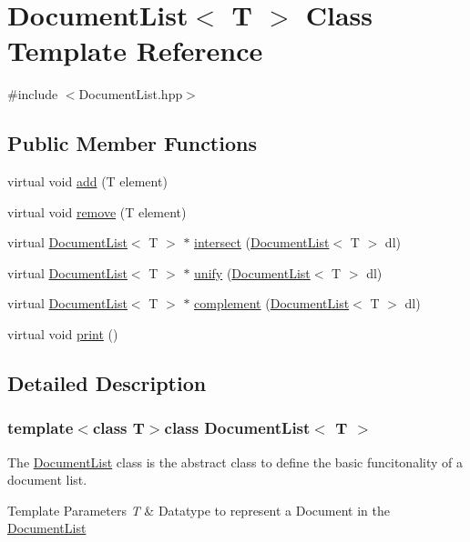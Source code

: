 \hypertarget{class_document_list}{\section{Document\-List$<$ T $>$ Class Template Reference}
\label{class_document_list}
}


{\ttfamily \#include $<$Document\-List.\-hpp$>$}

\subsection*{Public Member Functions}
\begin{DoxyCompactItemize}
\item 
virtual void \hyperlink{class_document_list_affbcf6455ab7095c14438eacd31858cb}{add} (T element)
\item 
virtual void \hyperlink{class_document_list_ab8f4e7a75701cee8cb0d699142040cbf}{remove} (T element)
\item 
virtual \hyperlink{class_document_list}{Document\-List}$<$ T $>$ $\ast$ \hyperlink{class_document_list_a4fef60658bbad8edb2faa1430a96c6b0}{intersect} (\hyperlink{class_document_list}{Document\-List}$<$ T $>$ dl)
\item 
virtual \hyperlink{class_document_list}{Document\-List}$<$ T $>$ $\ast$ \hyperlink{class_document_list_af870e03a60d7a46500576299857786c5}{unify} (\hyperlink{class_document_list}{Document\-List}$<$ T $>$ dl)
\item 
virtual \hyperlink{class_document_list}{Document\-List}$<$ T $>$ $\ast$ \hyperlink{class_document_list_a422ef895e470ea8b96688abc6c248b3c}{complement} (\hyperlink{class_document_list}{Document\-List}$<$ T $>$ dl)
\item 
virtual void \hyperlink{class_document_list_a4b813a82cebdad5852e431281e270579}{print} ()
\end{DoxyCompactItemize}


\subsection{Detailed Description}
\subsubsection*{template$<$class T$>$class Document\-List$<$ T $>$}

The \hyperlink{class_document_list}{Document\-List} class is the abstract class to define the basic funcitonality of a document list. 
\begin{DoxyTemplParams}{Template Parameters}
{\em T} & Datatype to represent a Document in the \hyperlink{class_document_list}{Document\-List} \\
\hline
\end{DoxyTemplParams}


